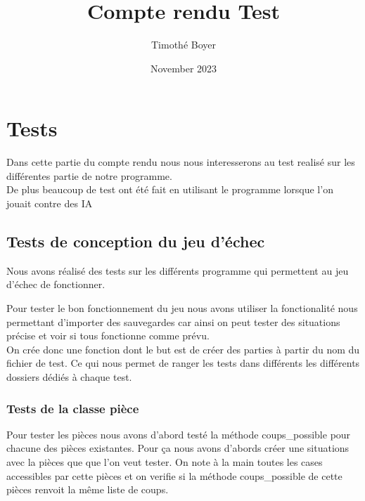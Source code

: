 \documentclass{article}
\title{Compte rendu Test}
\author{Timothé Boyer}
\date{November 2023}
\begin{document}
\maketitle

\section{Tests}
Dans cette partie du compte rendu nous nous interesserons au test realisé sur les différentes partie de notre programme.
\\
De plus beaucoup de test ont été fait en utilisant le programme lorsque l'on jouait contre des IA
\subsection{Tests de conception du jeu d'échec}
Nous avons réalisé des tests sur les différents programme qui permettent au jeu d'échec de fonctionner.

Pour tester le bon fonctionnement du jeu nous avons utiliser la fonctionalité nous permettant d'importer des sauvegardes car ainsi on peut tester des situations précise et voir si tous fonctionne comme prévu.
\\
On crée donc une fonction dont le but est de créer des parties à partir du nom du fichier de test. Ce qui nous permet de ranger les tests dans différents les différents dossiers dédiés à chaque test.

\subsubsection{Tests de la classe pièce}
Pour tester les pièces nous avons d'abord testé la méthode coups\_possible pour chacune des pièces existantes. Pour ça nous avons d'abords créer une situations avec la pièces que que l'on veut tester. On note à la main toutes les cases accessibles par cette pièces et on verifie si la méthode coups\_possible de cette pièces renvoit la même liste de coups.
\end{document}

